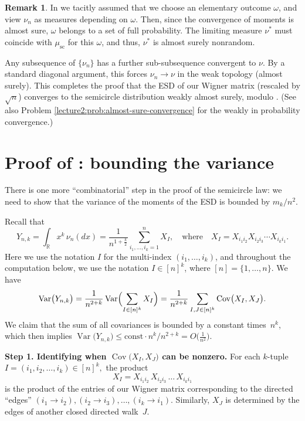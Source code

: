 \documentclass[letterpaper,11pt,oneside,reqno]{book}
\numberwithin{equation}{chapter}  %
\theoremstyle{definition}
\newtheorem{remark}[proposition]{Remark}
\begin{document}
\begin{remark}
	In 
	we tacitly assumed that we choose an elementary outcome $\omega$,
	and view $\nu_n$ as measures depending on $\omega$.
	Then, since the convergence of moments is almost sure,
	$\omega$ belongs to a set of full probability.
	The limiting measure $\nu^*$ must coincide
	with $\mu_{\mathrm{sc}}$ for this $\omega$,
	and thus, $\nu^*$ is almost surely nonrandom.
\end{remark}

Any subsequence of \(\{\nu_n\}\) has a further
sub-subsequence convergent to \(\nu\).  By a standard
diagonal argument, this forces \(\nu_n\to\nu\) in the weak
topology (almost surely).  This completes the proof that the ESD of our
Wigner matrix (rescaled by \(\sqrt{n}\)) converges to the
semicircle distribution weakly almost surely,
modulo .
(See also Problem \ref{lecture2:prob:almost-sure-convergence}
for the weakly in probability convergence.)


\section{Proof \texorpdfstring{of }{}: bounding the variance}
\label{lecture2:sub:variance-bound-proof}

There is one more ``combinatorial'' step in the proof of the
semicircle law: we need to show that the variance of the
moments of the ESD is bounded by \(m_k/n^2\).

Recall that
\[
	Y_{n,k}
	=\int_{\mathbb{R}}x^k\,\nu_n(dx)
	=\frac{1}{n^{1+\frac{k}{2}}}
	\sum_{i_1,\ldots,i_k=1}^{n} X_I,
	\quad
	\text{where}
	\quad
	X_I=X_{i_1 i_2}X_{i_2 i_3}\cdots X_{i_{k}i_1}.
\]
Here we use the notation $I$ for the multi-index $(i_1,\ldots,i_k)$,
and throughout the computation below,
we use the notation $I\in[n]^k$,
where $[n]=\{1,\ldots,n\}$.
We have
\[
\operatorname{\mathrm{Var}}\bigl(Y_{n,k}\bigr)
	=
	\frac{1}{n^{2+k}}
	\operatorname{\mathrm{Var}}
	\Bigl(\sum_{I\in[n]^k}X_I\Bigr)
	=
	\frac{1}{n^{2+k}}
	\sum_{I,J\in[n]^k}
	\operatorname{\mathrm{Cov}}\bigl(X_I,X_J\bigr).
\]
We claim that the sum of all covariances is bounded by a constant times~\(n^k\), which then implies
\(\operatorname{\mathrm{Var}}\bigl(Y_{n,k}\bigr)\le \mathrm{const}\cdot n^k / n^{2+k}=O\bigl(\tfrac{1}{n^2}\bigr)\).

\medskip

\noindent
\textbf{Step 1. Identifying when \(\operatorname{\mathrm{Cov}}\bigl(X_I,X_J\bigr)\) can be nonzero.}
For each \(k\)-tuple \(I=(i_1,i_2,\dots,i_k)\in[n]^k,\) the product
\[
	X_I = X_{i_1i_2}\,X_{i_2i_3}\,\dots \,X_{i_k i_1}
\]
is the product of the entries of our Wigner matrix corresponding to the directed ``edges''
\((i_1 \to i_2), (i_2 \to i_3),\dots,(i_k \to i_1)\).
Similarly, \(X_J\) is determined by the edges of another closed directed walk~\(J\).
\end{document}
